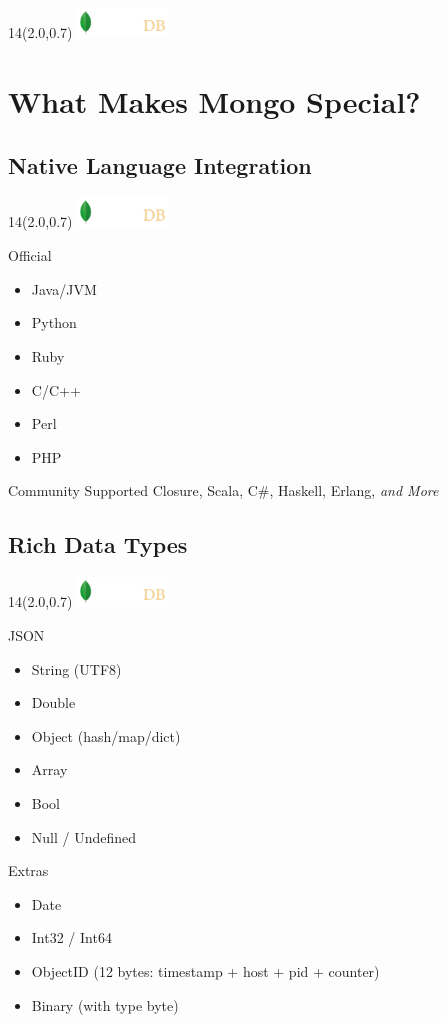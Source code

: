 \documentclass{beamer}
\newcommand{\MongoLogo}{
\begin{textblock}{14}(2.0,0.7)
  \includegraphics[height=0.8cm]{logo-mongodb-ondark.png}
\end{textblock}
}
\begin{document}
\begin{frame}
  \MongoLogo
  \center
\end{frame}

\section{What Makes Mongo Special?}

\subsection{Native Language Integration}

\begin{frame}
  \MongoLogo
  \begin{block}{Official}
    \begin{itemize}
      \item Java/JVM
      \item Python
      \item Ruby
      \item C/C++
      \item Perl
      \item PHP
    \end{itemize}
  \end{block}

  \begin{block}{Community Supported}
    Closure, 
    Scala,
    C\#,
    Haskell,
    Erlang,
    {\it and More}
  \end{block}
\end{frame}

\subsection{Rich Data Types}
\begin{frame}[fragile]
  \MongoLogo
  \begin{block}{JSON}
  \begin{itemize}
    \item String (UTF8)
    \item Double
    \item Object (hash/map/dict)
    \item Array
    \item Bool
    \item Null / Undefined
  \end{itemize}
  \end{block}

  \begin{block}{Extras}
  \begin{itemize}
    \item Date
    \item Int32 / Int64
    \item ObjectID (12 bytes: timestamp + host + pid + counter)
    \item Binary (with type byte)
  \end{itemize}
  \end{block}
\end{frame}
\end{document}
